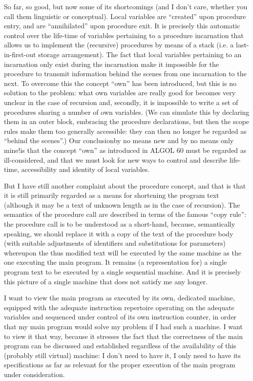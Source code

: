 \documentclass[twoside,11pt]{book}
\begin{document}
So far, so good, but now some of its shortcomings (and I don't care, whether you call them linguistic or conceptual). Local variables are ``created'' upon procedure entry, and are ``annihilated'' upon procedure exit. It is precisely this automatic control over the life-time of variables pertaining to a procedure incarnation that allows us to implement the (recursive) procedures by means of a stack (i.e. a last-in-first-out storage arrangement). The fact that local variables pertaining to an incarnation only exist during the incarnation make it impossible for the procedure to transmit information behind the scenes from one incarnation to the next. To overcome this the concept ``own'' has been introduced, but this is no solution to the problem: what own variables are really good for becomes very unclear in the case of recursion and, secondly, it is impossible to write a set of procedures sharing a number of own variables. (We can simulate this by declaring them in an outer block, embracing the procedure declarations, but then the scope rules make them too generally accessible: they can then no longer be regarded as ``behind the scenes''.) Our conclusion\textemdash{}by no means new and by no means only mine!\textemdash{}is that the concept ``own'' as introduced in ALGOL 60 must be regarded as ill-considered, and that we must look for new ways to control and describe life-time, accessibility and identity of local variables.

But I have still another complaint about the procedure concept, and that is that it is still primarily regarded as a means for shortening the program text (although it may be a text of unknown length as in the case of recursion). The semantics of the procedure call are described in terms of the famous ``copy rule'': the procedure call is to be understood as a short-hand, because, semantically speaking, we should replace it with a copy of the text of the procedure body (with suitable adjustments of identifiers and substitutions for parameters) whereupon the thus modified text will be executed by the same machine as the one executing the main program. It remains (a representation for) a single program text to be executed by a single sequential machine. And it is precisely this picture of a single machine that does not satisfy me any longer.

I want to view the main program as executed by its own, dedicated machine, equipped with the adequate instruction repertoire operating on the adequate variables and sequenced under control of its own instruction counter, in order that my main program would solve my problem if I had such a machine. I want to view it that way, because it stresses the fact that  the correctness of the main program can be discussed and established regardless of the availability of this (probably still virtual) machine: I don't
need to have it, I only need to have its specifications as far as relevant for the proper execution of the main program under consideration.
\end{document}
